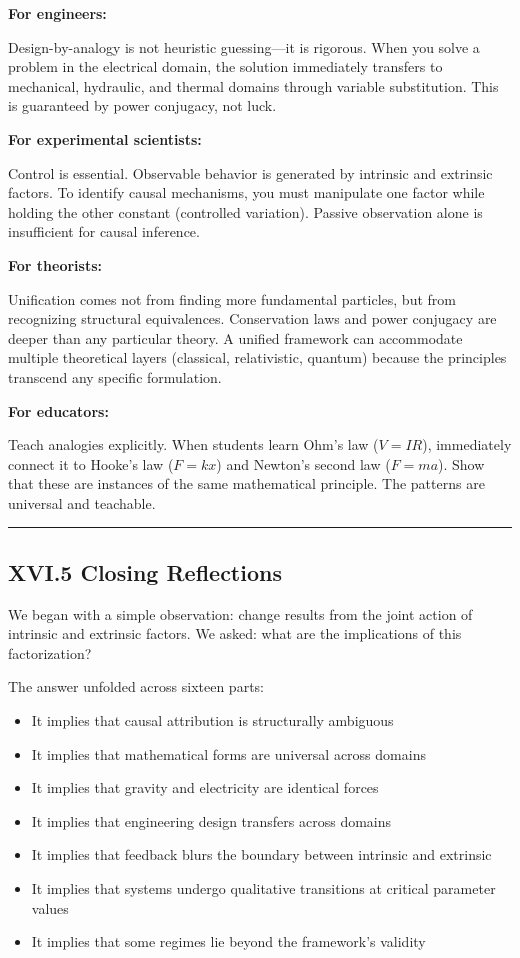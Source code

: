 \documentclass[
]{article}
\providecommand{\tightlist}{%
  \setlength{\itemsep}{0pt}\setlength{\parskip}{0pt}}
\begin{document}
\textbf{For engineers:}

Design-by-analogy is not heuristic guessing---it is rigorous. When you
solve a problem in the electrical domain, the solution immediately
transfers to mechanical, hydraulic, and thermal domains through variable
substitution. This is guaranteed by power conjugacy, not luck.

\textbf{For experimental scientists:}

Control is essential. Observable behavior is generated by intrinsic and
extrinsic factors. To identify causal mechanisms, you must manipulate
one factor while holding the other constant (controlled variation).
Passive observation alone is insufficient for causal inference.

\textbf{For theorists:}

Unification comes not from finding more fundamental particles, but from
recognizing structural equivalences. Conservation laws and power
conjugacy are deeper than any particular theory. A unified framework can
accommodate multiple theoretical layers (classical, relativistic,
quantum) because the principles transcend any specific formulation.

\textbf{For educators:}

Teach analogies explicitly. When students learn Ohm's law (\(V = IR\)),
immediately connect it to Hooke's law (\(F = kx\)) and Newton's second
law (\(F = ma\)). Show that these are instances of the same mathematical
principle. The patterns are universal and teachable.

\begin{center}\rule{0.5\linewidth}{0.5pt}\end{center}

\subsection{XVI.5 Closing Reflections}\label{xvi.5-closing-reflections}

We began with a simple observation: change results from the joint action
of intrinsic and extrinsic factors. We asked: what are the implications
of this factorization?

The answer unfolded across sixteen parts:

\begin{itemize}
\tightlist
\item
  It implies that causal attribution is structurally ambiguous
\item
  It implies that mathematical forms are universal across domains
\item
  It implies that gravity and electricity are identical forces
\item
  It implies that engineering design transfers across domains
\item
  It implies that feedback blurs the boundary between intrinsic and
  extrinsic
\item
  It implies that systems undergo qualitative transitions at critical
  parameter values
\item
  It implies that some regimes lie beyond the framework's validity
\end{itemize}
\end{document}
